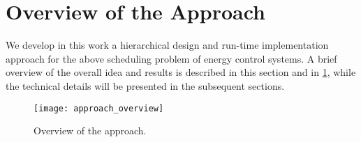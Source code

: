 \section{Overview of the Approach}
\label{sec:overview}

We develop in this work a hierarchical design and run-time implementation approach for the %
above scheduling problem of energy control systems.
A brief overview of the overall idea and results is described in this section and in \cref{fig:overview}, while the technical details will be presented in the subsequent sections.

\begin{figure}[tb]
  \centering
  \texttt{[image: approach\_overview]}
  \caption{Overview of the approach.}
  \label{fig:overview}
\end{figure}


